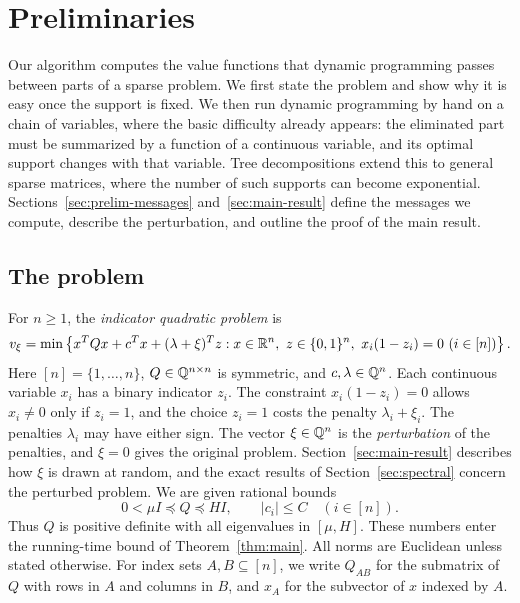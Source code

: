 \section{Preliminaries}\label{sec:model}
Our algorithm computes the value functions that dynamic programming
passes between parts of a sparse problem. We first state the problem and
show why it is easy once the support is fixed. We then run dynamic
programming by hand on a chain of variables, where the basic difficulty
already appears: the eliminated part must be summarized by a function of
a continuous variable, and its optimal support changes with that
variable. Tree decompositions extend this to general sparse matrices,
where the number of such supports can become exponential.
Sections~\ref{sec:prelim-messages} and~\ref{sec:main-result} define the
messages we compute, describe the perturbation, and outline the proof of
the main result.

\subsection{The problem}\label{sec:prelim-problem}
For $n\ge1$, the \emph{indicator quadratic problem} is
\begin{equation}\label{eq:problem}
 v_\xi=\min\left\{x^TQx+c^Tx+(\lambda+\xi)^Tz:
 x\in\mathbb R^n,\ z\in\{0,1\}^n,\ x_i(1-z_i)=0\ (i\in[n])\right\}.
\end{equation}
Here $[n]=\{1,\ldots,n\}$, $Q\in\mathbb Q^{n\times n}$ is symmetric, and
$c,\lambda\in\mathbb Q^n$. Each continuous variable $x_i$ has a binary indicator
$z_i$. The constraint $x_i(1-z_i)=0$ allows $x_i\ne0$ only if $z_i=1$,
and the choice $z_i=1$ costs the penalty $\lambda_i+\xi_i$. The penalties
$\lambda_i$ may have either sign. The vector $\xi\in\mathbb Q^n$ is the
\emph{perturbation} of the penalties, and $\xi=0$ gives the original
problem. Section~\ref{sec:main-result} describes how $\xi$ is drawn at
random, and the exact results of Section~\ref{sec:spectral} concern the
perturbed problem. We are given rational bounds
\begin{equation}\label{eq:spectral}
 0<\mu I\preceq Q\preceq HI,\qquad |c_i|\le C\quad(i\in[n]).
\end{equation}
Thus $Q$ is positive definite with all eigenvalues in $[\mu,H]$. These
numbers enter the running-time bound of Theorem~\ref{thm:main}. All norms
are Euclidean unless stated otherwise. For index sets $A,B\subseteq[n]$,
we write $Q_{AB}$ for the submatrix of $Q$ with rows in $A$ and columns
in $B$, and $x_A$ for the subvector of $x$ indexed by $A$.

